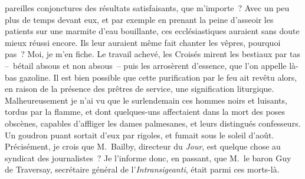 \documentclass[french,twoside]{book} %
\newcommand{\astertri}{\medskip\par\centerline{\color{rubric}\large\selectfont{\syms ✻\,✻\,✻}}\medskip\par}%
\begin{document}
pareilles conjonctures des résultats satisfaisants, que m’importe ? Avec un peu plus de temps devant eux, et par exemple en prenant la peine d’asseoir les patients sur une marmite d’eau bouillante, ces ecclésiastiques auraient sans doute mieux réussi encore. Ils leur auraient même fait chanter les vêpres, pourquoi pas ? Moi, je m’en fiche. Le travail achevé, les Croisés mirent les bestiaux par tas – bétail absous et non absous – puis les arrosèrent d’essence, que l’on appelle là-bas gazoline. Il est bien possible que cette purification par le feu ait revêtu alors, en raison de la présence des prêtres de service, une signification liturgique. Malheureusement je n’ai vu que le surlendemain ces hommes noirs et luisants, tordus par la flamme, et dont quelques-uns affectaient dans la mort des poses obscènes, capables d’affliger les dames palmesanes, et leurs distingués confesseurs. Un goudron puant sortait d’eux par rigoles, et fumait sous le soleil d’août. Précisément, je crois que M. Bailby, directeur du \emph{Jour}, est quelque chose au syndicat des journalistes ? Je l’informe donc, en passant, que M. le baron Guy de Traversay, secrétaire général de l’\emph{Intransigeanti}, était parmi ces morts-là.\par
 \par

\astertri
\end{document}
